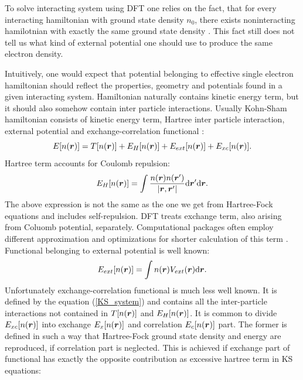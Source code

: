 \documentclass[openany, longbibliography,slovene,a4paper,12pt]{article}
\def\vec#1{\mbox{\boldmath$#1$}}
\newcommand{\dif}{\mathrm{d}}
\begin{document}
To solve interacting system using DFT one relies on the fact, that for every
interacting hamiltonian with ground state density $n_0$, there exists
noninteracting hamilotnian with exactly the same ground state density \cite{advanced_course}.
This fact still does not tell us what kind of external potential
one should use to produce the same electron density.

Intuitively, one would expect that potential belonging to effective single
electron hamiltonian should reflect the properties, geometry and potentials found
in a given interacting system. Hamiltonian naturally contains kinetic energy
term, but it should also somehow contain inter particle interactions. Usually
Kohn-Sham hamiltonian consists of kinetic energy term, Hartree inter particle
interaction, external potential and exchange-correlation functional \cite{advanced_course}:
\begin{equation} \label{KS_system}
  E[n(\vec r)]=T[n(\vec r)] + E_H[n(\vec r)] + E_{ext}[n(\vec r)] + E_{xc}[n(\vec r)].
\end{equation}
Hartree term accounts for Coulomb repulsion:
\begin{equation} \label{hartree_term1}
  E_H[n(\vec r)] = \int\frac{ n(\vec r) n(\vec r')}{|\vec r, \vec r'|} \dif \vec r' \dif \vec r.
\end{equation}
The above expression is not the same as the one we get from Hartree-Fock
equations and includes self-repulsion. DFT treats exchange term, also arising
from Coluomb potential, separately. Computational packages often employ different
approximation and optimizations for shorter calculation of this term \cite{orca}.
Functional belonging to external potential is well known: 
\begin{equation} \label{ext_potential_functional}
  E_{ext}[n(\vec r)] = \int n(\vec r) V_{ext}(\vec r) \dif \vec r.
\end{equation}
Unfortunately exchange-correlation functional is much less well known. It is
defined by the equation (\ref{KS_system}) and contains all the inter-particle
interactions not contained in $T[n(\vec r)]$ and $ E_H[n(\vec r)]$. It is
common to divide $E_{xc}[n(\vec r)]$ into exchange $E_x[n(\vec r)]$ and
correlation $E_c[n(\vec r)]$ part. The former is defined in such a way that
Hartree-Fock ground state density and energy are reproduced, if correlation part
is neglected. This is achieved if exchange part of functional has exactly the
opposite contribution as excessive hartree term in KS equations: 
\end{document}
